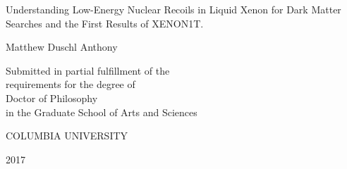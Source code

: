 
\thispagestyle{empty} %
\begin{center}
  \SingleSpace

  \vspace*{1in}

  Understanding Low-Energy Nuclear Recoils in Liquid Xenon for Dark Matter Searches and the First Results of XENON1T.

  \bigskip %

  Matthew Duschl Anthony

  \vspace{5in}

  Submitted in partial fulfillment of the\\
  requirements for the degree of\\
  Doctor of Philosophy\\
  in the Graduate School of Arts and Sciences

  \bigskip
  \bigskip

  COLUMBIA UNIVERSITY

  \bigskip %

  2017
\end{center}

